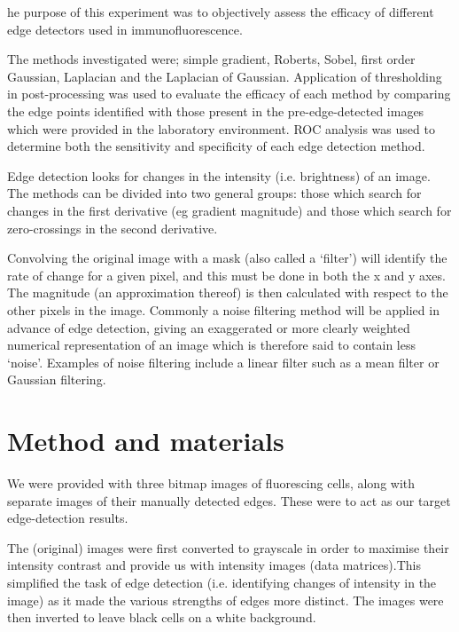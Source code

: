 \documentclass{article}
\begin{document}
\begin{article}
he purpose of this experiment was to objectively assess the efficacy of different edge detectors used in immunofluorescence. \par
The methods investigated were; simple gradient, Roberts, Sobel, first order Gaussian, Laplacian and the Laplacian of Gaussian. Application of thresholding in post-processing was used to evaluate the efficacy of each method by comparing the edge points identified with those present in the pre-edge-detected images which were provided in the laboratory environment. ROC analysis was used to determine both the sensitivity and specificity of each edge detection method. \par
Edge detection looks for changes in the intensity (i.e. brightness) of an image. The methods can be divided into two general groups: those which search for changes in the first derivative (eg gradient magnitude) and those which search for zero-crossings in the second derivative. \par
Convolving the original image with a mask (also called a ‘filter’) will identify the rate of change for a given pixel, and this must be done in both the x and y axes. The magnitude (an approximation thereof) is then calculated with respect to the other pixels in the image. Commonly a noise filtering method will be applied in advance of edge detection, giving an exaggerated or more clearly weighted numerical representation of an image which is therefore said to contain less ‘noise’. Examples of noise filtering include a linear filter such as a mean filter or Gaussian filtering. \par


\section{Method and materials}

We were provided with three bitmap images of fluorescing cells, along with separate images of their manually detected edges. These were to act as our target edge-detection results. \par
The (original) images were first converted to grayscale in order to maximise their intensity contrast and provide us with intensity images (data matrices).This simplified the task of edge detection (i.e. identifying changes of intensity in the image) as it made the various strengths of edges more distinct. The images were then inverted to leave black cells on a white background. 


\end{article}
\end{document}
